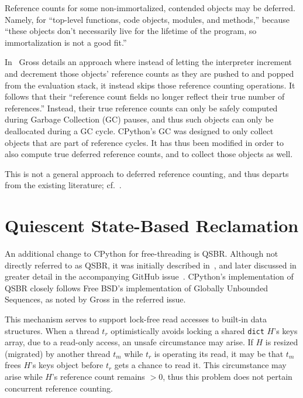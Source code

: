 Reference counts for some non-immortalized, contended objects may be deferred.
Namely, for ``top-level functions, code objects, modules, and methods,'' because ``these objects don't necessarily live for the lifetime of the program, so immortalization is not a good fit.''

In~\cite[\S Deferred Reference Counting]{pep703} Gross details an approach where instead of letting the interpreter increment and decrement those objects' reference counts as they are pushed to and popped from the evaluation stack, it instead skips those reference counting operations.
It follows that their ``reference count fields no longer reflect their true number of references.''
Instead, their true reference counts can only be safely computed during Garbage Collection (GC) pauses, and thus such objects can only be deallocated during a GC cycle.
CPython's GC was designed to only collect objects that are part of reference cycles.
It has thus been modified in order to also compute true deferred reference counts, and to collect those objects as well.

This is not a general approach to deferred reference counting, and thus departs from the existing literature; cf.~\cite{deferred-refcounting}.


\section{Quiescent State-Based Reclamation}\label{sec:qsbr}

An additional change to CPython for free-threading is QSBR\@.
Although not directly referred to as QSBR, it was initially described in~\cite[\S Mimalloc Page Reuse]{pep703}, and later discussed in greater detail in the accompanying GitHub issue~\cite{qsbr}.
CPython's implementation of QSBR closely follows Free BSD's implementation of Globally Unbounded Sequences, as noted by Gross in the referred issue.

This mechanism serves to support lock-free read accesses to built-in data structures.
When a thread $t_r$ optimistically avoids locking a shared \texttt{dict} $H$'s keys array, due to a read-only access, an unsafe circumstance may arise.
If $H$ is resized (migrated) by another thread $t_m$ while $t_r$ is operating its read, it may be that $t_m$ frees $H$'s keys object before $t_r$ gets a chance to read it.
This circumstance may arise while $H$'s reference count remains $> 0$, thus this problem does not pertain concurrent reference counting.

